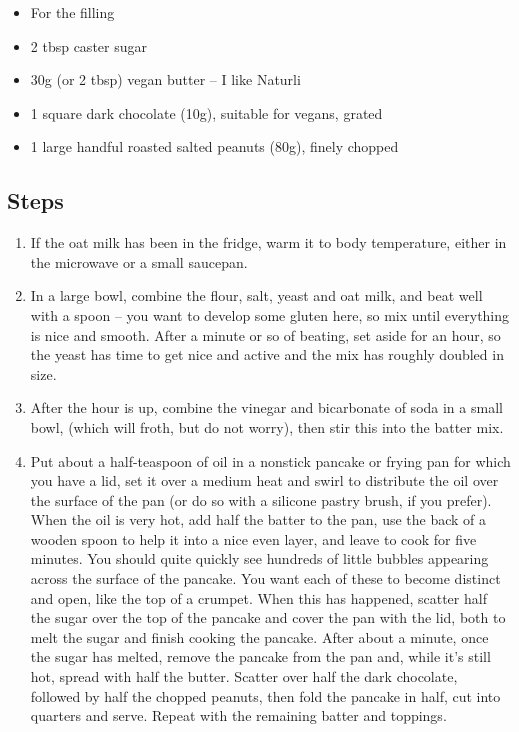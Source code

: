 \documentclass{book}
\begin{document}
\begin{itemize}
\item For the filling 
\item 2 tbsp caster sugar
\item 30g (or 2 tbsp) vegan butter – I like Naturli
\item 1 square dark chocolate (10g), suitable for vegans, grated
\item 1 large handful roasted salted peanuts (80g), finely chopped
\end{itemize}

\subsection*{Steps}
\begin{enumerate}
\item If the oat milk has been in the fridge, warm it to body temperature, either in the microwave or a small saucepan.
\item In a large bowl, combine the flour, salt, yeast and oat milk, and beat well with a spoon – you want to develop some gluten here, so mix until everything is nice and smooth. After a minute or so of beating, set aside for an hour, so the yeast has time to get nice and active and the mix has roughly doubled in size.
\item After the hour is up, combine the vinegar and bicarbonate of soda in a small bowl, (which will froth, but do not worry), then stir this into the batter mix.
\item Put about a half-teaspoon of oil in a nonstick pancake or frying pan for which you have a lid, set it over a medium heat and swirl to distribute the oil over the surface of the pan (or do so with a silicone pastry brush, if you prefer). When the oil is very hot, add half the batter to the pan, use the back of a wooden spoon to help it into a nice even layer, and leave to cook for five minutes. You should quite quickly see hundreds of little bubbles appearing across the surface of the pancake. You want each of these to become distinct and open, like the top of a crumpet. When this has happened, scatter half the sugar over the top of the pancake and cover the pan with the lid, both to melt the sugar and finish cooking the pancake. After about a minute, once the sugar has melted, remove the pancake from the pan and, while it’s still hot, spread with half the butter. Scatter over half the dark chocolate, followed by half the chopped peanuts, then fold the pancake in half, cut into quarters and serve. Repeat with the remaining batter and toppings.
\end{enumerate}
\newpage
\end{document}
